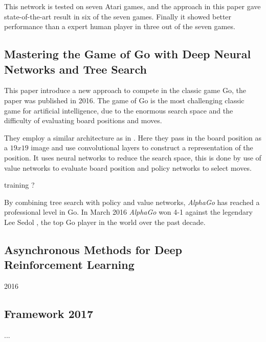 This network is tested on seven Atari games, and the approach in this paper gave state-of-the-art result in six of the seven games. Finally it showed better performance than a expert human player in three out of the seven games.  

\subsection{Mastering the Game of Go with Deep Neural Networks and Tree Search}\cite{Silver_2016}
This paper introduce a new approach to compete in the classic game Go, the paper was published in 2016. The game of Go is the most challenging classic game for artificial intelligence, due to the enormous search space and the difficulty of evaluating board positions and moves. 

They employ a similar architecture as in \cite{DBLP:journals/corr/MnihKSGAWR13}. Here they pass in the board position as a $19 x 19$ image and use convolutional layers to construct a representation of the position. It uses neural networks to reduce the search space, this is done by use of value networks to evaluate board position and policy networks to select moves.

training ? 

By combining tree search with policy and value networks, \textit{AlphaGo} has reached a professional level in Go. In March 2016 \textit{AlphaGo} won 4-1 against the legendary Lee Sedol , the top Go player in the world over the past decade.  

\subsection{Asynchronous Methods for Deep Reinforcement Learning}\cite{DBLP:journals/corr/MnihBMGLHSK16}
2016
\subsection{Framework 2017}
...